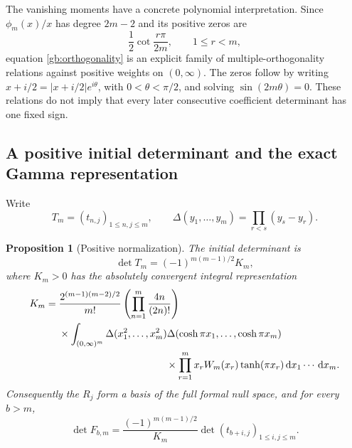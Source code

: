 \documentclass[11pt,a4paper]{article}
\numberwithin{equation}{section}
\newtheorem{proposition}[theorem]{Proposition}
\theoremstyle{definition}
\theoremstyle{remark}
\newcommand{\dd}{\,\mathrm d}
\begin{document}
The vanishing moments have a concrete polynomial interpretation.
Since $\phi_m(x)/x$ has degree $2m-2$ and its positive zeros are
\[
                  \frac12\cot\frac{r\pi}{2m},\qquad1\le r<m,
\]
equation \eqref{gb:orthogonality} is an explicit family of
multiple-orthogonality relations against positive weights on
$(0,\infty)$.  The zeros follow by writing
$x+i/2=|x+i/2|e^{i\theta}$, with $0<\theta<\pi/2$, and solving
$\sin(2m\theta)=0$.  These relations do not imply that every
later consecutive coefficient determinant has one fixed sign.

\subsection{A positive initial determinant and the exact Gamma representation}

Write
\[
 T_m=(t_{n,j})_{1\le n,j\le m},\qquad
 \Delta(y_1,\ldots,y_m)=\prod_{r<s}(y_s-y_r).
\]

\begin{proposition}[Positive normalization]\label{gb:normalization}
The initial determinant is
\begin{equation}\label{gb:detT}
                 \det T_m=(-1)^{m(m-1)/2}K_m,
\end{equation}
where $K_m>0$ has the absolutely convergent integral representation
\begin{equation}\label{gb:Km}
\begin{split}
 K_m={}&\frac{2^{(m-1)(m-2)/2}}{m!}
             \left(\prod_{n=1}^m\frac{4n}{(2n)!}\right)\\
 &\times\int_{(0,\infty)^m}
       \Delta(x_1^2,\ldots,x_m^2)
       \Delta(\cosh\pi x_1,\ldots,\cosh\pi x_m)\\
 &\hspace{38mm}\times
       \prod_{r=1}^m x_rW_m(x_r)\tanh(\pi x_r)
                    \dd x_1\cdots\dd x_m.
\end{split}
\end{equation}
Consequently the $R_j$ form a basis of the full formal null space,
and for every $b>m$,
\begin{equation}\label{gb:exact-Gamma-determinant}
 \boxed{\displaystyle
 \det F_{b,m}=
  \frac{(-1)^{m(m-1)/2}}{K_m}
        \det(t_{b+i,j})_{1\le i,j\le m}.}
\end{equation}
\end{proposition}
\end{document}
